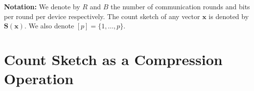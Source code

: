 \documentclass[twoside]{article}
\newtheorem{definition}{Definition}
\begin{document}


\vspace{0.05in}\noindent\textbf{Notation:} 
We denote by $R$ and $B$ the number of communication rounds and bits per round per device respectively. 
The count sketch of any vector $\boldsymbol{x}$ is denoted by $\mathbf{S}(\boldsymbol{x})$. We also denote $[p] =\{1,\dots,p\}$.

\vspace{-0.05in}
\section{Count Sketch as a Compression Operation}\label{sec:compression}
\vspace{-0.05in}
\end{document}
